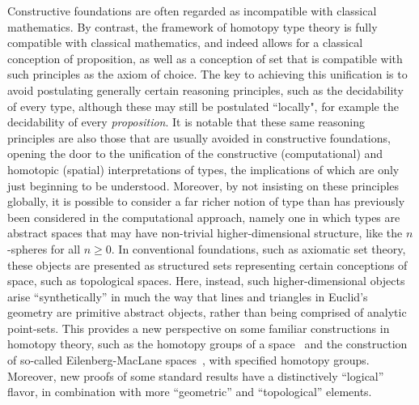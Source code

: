 \documentclass[11pt]{article}
\theoremstyle{remark}
\theoremstyle{definition}
\begin{document}
Constructive foundations are often regarded as incompatible with classical mathematics.  By
contrast, the framework of homotopy type theory is fully compatible with classical mathematics, and indeed allows for a classical conception of proposition, as well as a conception of set that is compatible with such principles as the axiom of choice.  
The key to achieving this unification is to avoid postulating generally certain reasoning principles, such as the decidability of every type, although these may still  be postulated ``locally", for example the decidability of every \emph{proposition}.  
It is notable that these same reasoning principles are also those that are usually avoided in constructive foundations, opening the door to the unification of the constructive (computational) and homotopic (spatial) interpretations of types, the implications of which are only just beginning to be understood.
Moreover, by not insisting on these principles globally, it is possible to consider a far richer notion of type than has
previously been considered in the computational approach, namely one in which types are abstract spaces that may have non-trivial
higher-dimensional structure, like the $n$-spheres for all $n\geq 0$.  In conventional foundations, such
as axiomatic set theory, these objects are presented as structured sets representing certain conceptions of space,
such as topological spaces.  Here, instead, such higher-dimensional objects arise ``synthetically''
in much the way that lines and triangles in Euclid's geometry are primitive abstract objects, rather than being comprised of analytic point-sets.  This provides a new perspective on some familiar constructions in homotopy theory, such as the homotopy groups of
a space~\cite{HoTTbook,LS-Circ,LB-PinSn} and the construction of so-called Eilenberg-MacLane spaces~\cite{LF-EM}, with specified
homotopy groups.  Moreover, new proofs of some standard results have a distinctively ``logical'' flavor, in combination with more ``geometric'' and
``topological'' elements.
\end{document}
